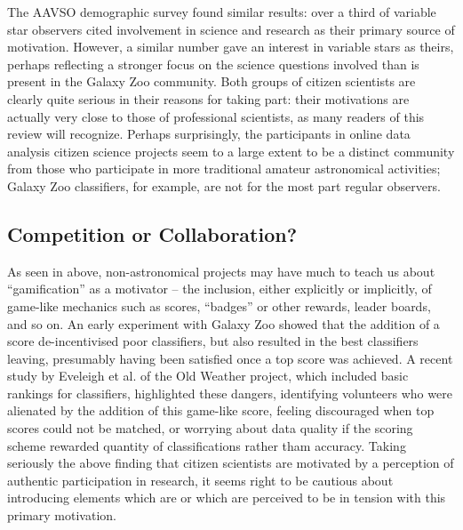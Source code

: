 \documentclass{ar2e}
\begin{document}
The AAVSO demographic survey \citep{P+P2012} found similar results: over a third
of variable star observers cited involvement in science and research as their
primary source of motivation. However, a similar number gave an interest in
variable stars as theirs, perhaps reflecting a stronger focus on the science
questions involved than is present in the Galaxy Zoo community. Both groups of
citizen scientists are clearly quite serious in their reasons for taking part:
their motivations are actually very close to those of professional scientists,
as many readers of this review will recognize. Perhaps surprisingly, the
participants in online data analysis citizen science projects seem to a large
extent to be a distinct community from those who participate in more traditional
amateur astronomical activities; Galaxy Zoo classifiers, for example, are not
for the most part regular observers. 






\subsection{Competition or Collaboration?}
\label{sec:crowd:gamification}

As seen in  above, non-astronomical projects may have
much to teach us about ``gamification'' as a motivator -- the inclusion, either
explicitly or implicitly, of game-like mechanics such as scores, ``badges'' or
other rewards, leader boards, and so on. An early experiment with Galaxy Zoo
showed that the addition of a score de-incentivised poor classifiers, but also
resulted in the best classifiers leaving, presumably having been satisfied once
a top score was achieved. A recent study by Eveleigh et al. of the Old Weather
project, which included basic rankings for classifiers, highlighted these
dangers, identifying volunteers who were alienated by the addition of this
game-like score, feeling discouraged when top scores could not be matched, or
worrying about data quality if the scoring scheme rewarded quantity of
classifications rather tham accuracy. Taking seriously the above finding 
that citizen scientists are motivated by a perception of authentic
participation in research, it seems right to be cautious about introducing
elements which are or which are perceived to be in tension with this primary
motivation. 
\end{document}
